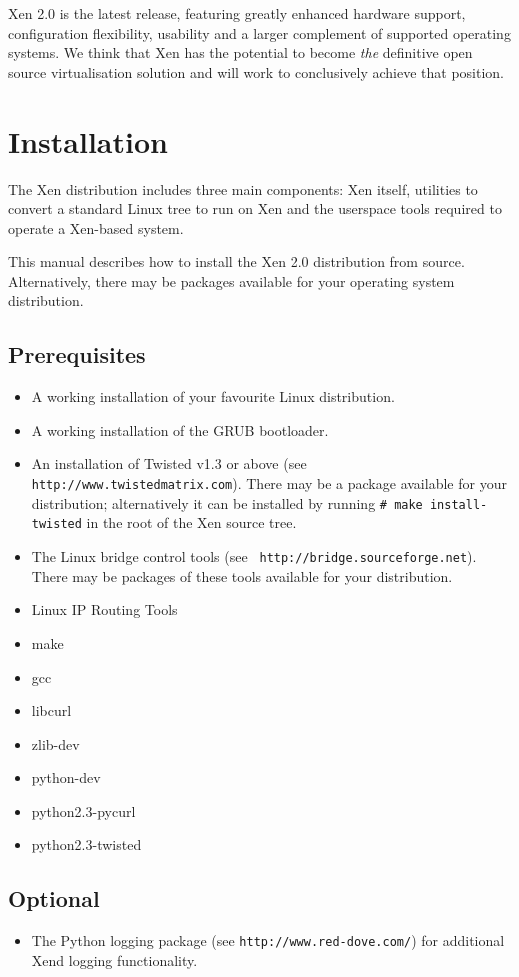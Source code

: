 \documentclass[11pt,twoside,final,openright]{xenstyle}
\begin{document}
Xen 2.0 is the latest release, featuring greatly enhanced hardware
support, configuration flexibility, usability and a larger complement
of supported operating systems.  We think that Xen has the potential
to become {\em the} definitive open source virtualisation solution and
will work to conclusively achieve that position.


\chapter{Installation}

The Xen distribution includes three main components:  Xen itself,
utilities to convert a standard Linux tree to run on Xen and the
userspace tools required to operate a Xen-based system.

This manual describes how to install the Xen 2.0 distribution from
source.  Alternatively, there may be packages available for your
operating system distribution.

\section{Prerequisites}
\label{sec:prerequisites}
\begin{itemize}
\item A working installation of your favourite Linux distribution.
\item A working installation of the GRUB bootloader.
\item An installation of Twisted v1.3 or above (see {\tt
http://www.twistedmatrix.com}).  There may be a package available for
your distribution; alternatively it can be installed by running {\tt \#
make install-twisted} in the root of the Xen source tree.
\item The Linux bridge control tools (see {\tt
http://bridge.sourceforge.net}).  There may be packages of these tools
available for your distribution.
\item Linux IP Routing Tools
\item make
\item gcc
\item libcurl
\item zlib-dev
\item python-dev
\item python2.3-pycurl
\item python2.3-twisted
\end{itemize}

\section{Optional}
\begin{itemize}
\item The Python logging package (see {\tt http://www.red-dove.com/})
for additional Xend logging functionality.
\end{itemize}
\end{document}
